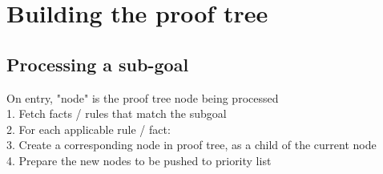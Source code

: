 \section{Building the proof tree}

\subsection{Processing a sub-goal}
On entry, "node" is the proof tree node being processed\\
1. Fetch facts / rules that match the subgoal\\
2. For each applicable rule / fact:\\
3.     Create a corresponding node in proof tree, as a child of the current node\\
4. Prepare the new nodes to be pushed to priority list


